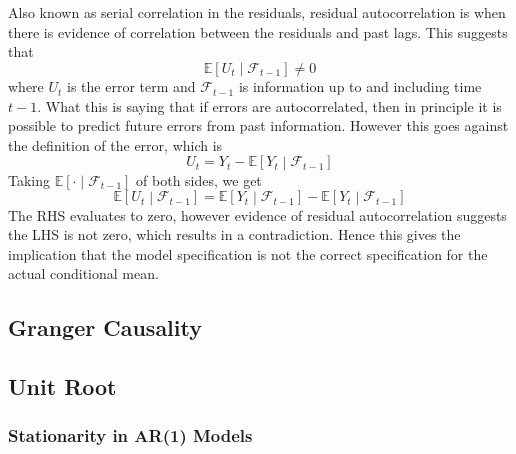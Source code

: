 \documentclass[11pt]{report} %
\begin{document}
Also known as serial correlation in the residuals, residual autocorrelation is when there is evidence of correlation between the residuals and past lags. This suggests that
\begin{equation}
\mathbb{E}\left[U_{t}\middle|\mathcal{F}_{t - 1}\right] \neq 0
\end{equation}
where $U_{t}$ is the error term and $\mathcal{F}_{t - 1}$ is information up to and including time $t - 1$. What this is saying that if errors are autocorrelated, then in principle it is possible to predict future errors from past information. However this goes against the definition of the error, which is
\begin{equation}
U_{t} = Y_{t} - \mathbb{E}\left[Y_{t}\middle|\mathcal{F}_{t - 1}\right]
\end{equation}
Taking $\mathbb{E}\left[\cdot\middle|\mathcal{F}_{t - 1}\right]$ of both sides, we get
\begin{equation}
\mathbb{E}\left[U_{t}\middle|\mathcal{F}_{t - 1}\right] = \mathbb{E}\left[Y_{t}\middle|\mathcal{F}_{t - 1}\right] - \mathbb{E}\left[Y_{t}\middle|\mathcal{F}_{t - 1}\right]
\end{equation}
The RHS evaluates to zero, however evidence of residual autocorrelation suggests the LHS is not zero, which results in a contradiction. Hence this gives the implication that the model specification is not the correct specification for the actual conditional mean.

\subsection{Granger Causality}

\subsection{Unit Root}

\subsubsection{Stationarity in AR(1) Models}
\end{document}
